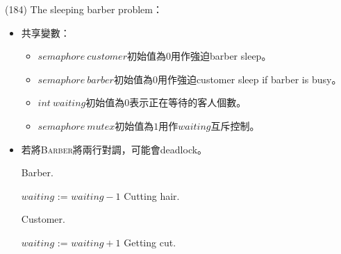 \begin{theorem}{(184)} The sleeping barber problem：\begin{itemize}
        \item 共享變數：\begin{itemize}
            \item $semaphore \ customer$初始值為$0$用作強迫barber sleep。
            \item $semaphore \ barber$初始值為$0$用作強迫customer sleep if barber is busy。
            \item $int \ waiting$初始值為$0$表示正在等待的客人個數。
            \item $semaphore \ mutex$初始值為$1$用作$waiting$互斥控制。
        \end{itemize}
        \item 若將\textsc{Barber}將兩行對調，可能會deadlock。
        \begin{algorithm}[H]
            \caption{Barber.}
            \begin{algorithmic}[1]
                    \Repeat
                        \State {} 
                        \State {}
                        \State $waiting$ := $waiting - 1$
                        \State {} 
                        \State {}
                        \State Cutting hair.
                \EndFunction
            \end{algorithmic}
        \end{algorithm}
        \begin{algorithm}[H]
            \caption{Customer.}
            \begin{algorithmic}[1]
                    \Repeat
                        \State {}
                         
                            \State $waiting$ := $waiting + 1$
                            \State {}
                            \State {} 
                            \State {} 
                            \State Getting cut.
                        \Else
                            \State {}
                        \EndIf
                \EndFunction
            \end{algorithmic}
        \end{algorithm}
    \end{itemize}
\end{theorem}

